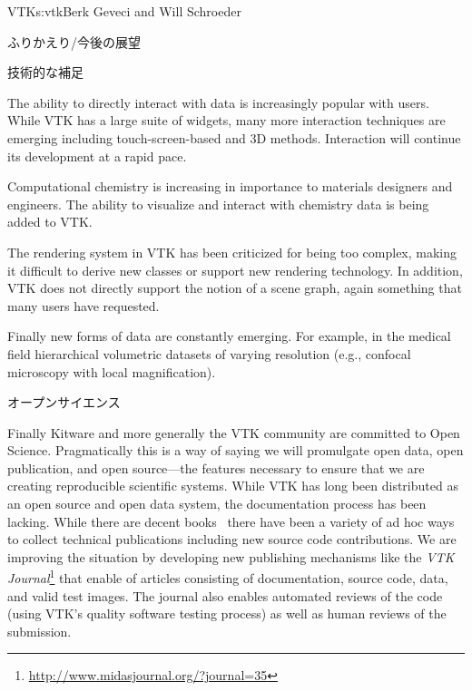 \begin{aosachapter}{VTK}{s:vtk}{Berk Geveci and Will Schroeder}
\begin{aosasect1}{ふりかえり/今後の展望}
\begin{aosasect2}{技術的な補足}
\begin{aosaitemize}
  \item The ability to directly interact with data is increasingly
  popular with users. While VTK has a large suite of widgets, many
  more interaction techniques are emerging including
  touch-screen-based and 3D methods. Interaction will continue its
  development at a rapid pace.

  \item Computational chemistry is increasing in importance to materials
  designers and engineers. The ability to visualize and interact with
  chemistry data is being added to VTK.

  \item The rendering system in VTK has been criticized for being too
  complex, making it difficult to derive new classes or support new
  rendering technology. In addition, VTK does not directly support the
  notion of a scene graph, again something that many users have
  requested.

  \item Finally new forms of data are constantly emerging. For example,
  in the medical field hierarchical volumetric datasets of varying
  resolution (e.g., confocal microscopy with local magnification).

\end{aosaitemize}

\end{aosasect2}

\begin{aosasect2}{オープンサイエンス}

Finally Kitware and more generally the VTK community are committed to
Open Science. Pragmatically this is a way of saying we will promulgate
open data, open publication, and open source---the features necessary
to ensure that we are creating reproducible scientific systems. While
VTK has long been distributed as an open source and open data system,
the documentation process has been lacking. While there are decent
books~\cite{bib:vtk:userguide,bib:vtk:toolkit} there
have been a variety of ad hoc ways to collect technical publications
including new source code contributions. We are improving the
situation by developing new publishing mechanisms like the \emph{VTK
Journal}\footnote{\url{http://www.midasjournal.org/?journal=35}}
that enable of articles consisting of documentation, source code,
data, and valid test images. The journal also enables automated
reviews of the code (using VTK's quality software testing process) as
well as human reviews of the submission.


\end{aosasect2}
\end{aosasect1}
\end{aosachapter}
